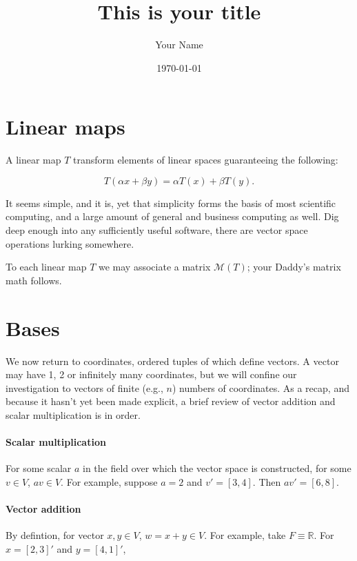 \documentclass{article}
\title{This is your title}
\author{Your Name}
\date{\today}
\begin{document}
\maketitle

\tableofcontents

\section{Linear maps}

A linear map $T$ transform elements of linear spaces guaranteeing
the following:

\begin{equation}
  \label{eq:linear-map}
  T(\alpha x + \beta y) = \alpha T(x) + \beta T(y).
\end{equation}


It seems simple, and it is, yet that simplicity forms the
basis of most scientific computing, and a large amount of
general and business computing as well. Dig deep enough into
any sufficiently useful software, there are vector space
operations lurking somewhere.

To each linear map $T$ we may associate a matrix $\mathcal{M}(T)$;
your Daddy's matrix math follows.


\section{Bases}

We now return to coordinates, ordered tuples of which define vectors.
A vector may have 1, 2 or infinitely many coordinates, but we will confine
our investigation to vectors of finite (e.g., $n$) numbers of coordinates.
As a recap, and because it hasn't yet been made explicit, a brief review
of vector addition and scalar multiplication is in order.

\paragraph{Scalar multiplication} For some scalar $a$ in the field
over which the vector space is constructed, for some $v \in V$,
$av\in V$. For example, suppose $a = 2$ and $v' = [3, 4]$. Then
$av' = [6, 8]$.


\paragraph{Vector addition} By defintion, for vector $x, y \in V$,
$w = x + y \in V$. For example, take $F\equiv\mathbb{R}$. For
$x = [2, 3]'$ and $y = [4, 1]'$,
\end{document}
